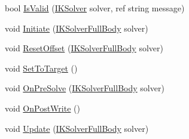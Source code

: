 \begin{DoxyCompactItemize}
\item 
bool \mbox{\hyperlink{class_root_motion_1_1_final_i_k_1_1_i_k_effector_ad183ef6b0f143604fec88bba5126ec53}{Is\+Valid}} (\mbox{\hyperlink{class_root_motion_1_1_final_i_k_1_1_i_k_solver}{I\+K\+Solver}} solver, ref string message)
\item 
void \mbox{\hyperlink{class_root_motion_1_1_final_i_k_1_1_i_k_effector_a10b51db799b0056619da99d7273f2653}{Initiate}} (\mbox{\hyperlink{class_root_motion_1_1_final_i_k_1_1_i_k_solver_full_body}{I\+K\+Solver\+Full\+Body}} solver)
\item 
void \mbox{\hyperlink{class_root_motion_1_1_final_i_k_1_1_i_k_effector_a93ab0521ce49bc589267dbfb6ffb263c}{Reset\+Offset}} (\mbox{\hyperlink{class_root_motion_1_1_final_i_k_1_1_i_k_solver_full_body}{I\+K\+Solver\+Full\+Body}} solver)
\item 
void \mbox{\hyperlink{class_root_motion_1_1_final_i_k_1_1_i_k_effector_aaade6c51db820a652116e4a8048d19e1}{Set\+To\+Target}} ()
\item 
void \mbox{\hyperlink{class_root_motion_1_1_final_i_k_1_1_i_k_effector_a61b3a639a672969a567017522e3fdf9d}{On\+Pre\+Solve}} (\mbox{\hyperlink{class_root_motion_1_1_final_i_k_1_1_i_k_solver_full_body}{I\+K\+Solver\+Full\+Body}} solver)
\item 
void \mbox{\hyperlink{class_root_motion_1_1_final_i_k_1_1_i_k_effector_a480ab34593ba78be93560f3c43477aad}{On\+Post\+Write}} ()
\item 
void \mbox{\hyperlink{class_root_motion_1_1_final_i_k_1_1_i_k_effector_a68357766a32e45dd3f6ba4860b0d88e6}{Update}} (\mbox{\hyperlink{class_root_motion_1_1_final_i_k_1_1_i_k_solver_full_body}{I\+K\+Solver\+Full\+Body}} solver)
\end{DoxyCompactItemize}
